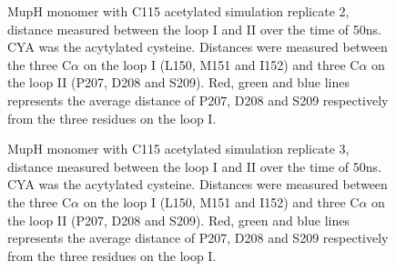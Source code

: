 		\setlength\fboxsep{5pt}
		\setlength\fboxrule{1.5pt}
		\begin{figure}[htbp]
		\centering
		\caption[MupH monomer with C115 acetylated simulation replicate 2, distance measured between the loop I and II over the time of 50ns.]{MupH monomer with C115 acetylated simulation replicate 2, distance measured between the loop I and II over the time of 50ns. CYA was the acytylated cysteine. Distances were measured between the three C$ \alpha $ on the loop I (L150, M151 and I152) and three C$ \alpha $ on the loop II (P207, D208 and S209). Red, green and blue lines represents the average distance of P207, D208 and S209 respectively from the three residues on the loop I.}
		\label{fig:muphcyaSim1}
		\end{figure}

		\setlength\fboxsep{5pt}
		\setlength\fboxrule{1.5pt}
		\begin{figure}[htbp]
		\centering
		\caption[MupH monomer with C115 acetylated simulation replicate 3, distance measured between the loop I and II over the time of 50ns.]{MupH monomer with C115 acetylated simulation replicate 3, distance measured between the loop I and II over the time of 50ns. CYA was the acytylated cysteine. Distances were measured between the three C$ \alpha $ on the loop I (L150, M151 and I152) and three C$ \alpha $ on the loop II (P207, D208 and S209). Red, green and blue lines represents the average distance of P207, D208 and S209 respectively from the three residues on the loop I.}
		\label{fig:muphcyaSim2}
		\end{figure}

